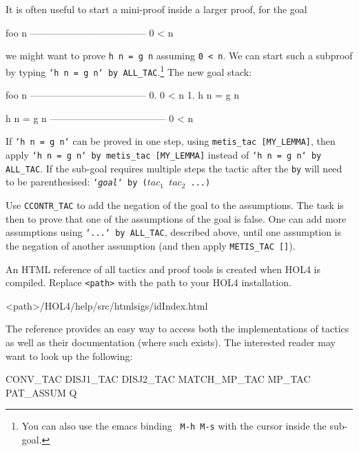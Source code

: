 \documentclass[a4paper,10pt]{article}
\begin{document}

It is often useful to start a mini-proof inside a larger proof, \eg{} for the goal
\begin{code}
    foo n
    ------------------------------------
      0 < n
\end{code}
we might want to prove {\tt\small h n = g n} assuming {\tt\small 0 <
  n}.  We can start such a subproof by typing {\tt\small `h n = g n`
  by ALL\_TAC}.\footnote{You can also use the emacs binding {\tt\small
    M-h M-s} with the cursor inside the sub-goal.} The new goal stack:
\begin{code}
    foo n
    ------------------------------------
      0.  0 < n
      1.  h n = g n

    h n = g n
    ------------------------------------
      0 < n
\end{code}
If {\tt\small `h n = g n`} can be proved in one step, \eg{} using {\tt\small metis\_tac [MY\_LEMMA]}, then
apply {\tt\small `h n = g n` by metis\_tac [MY\_LEMMA]} instead of
{\tt\small `h n = g n` by ALL\_TAC}.  If the sub-goal requires
multiple steps the tactic after the \texttt{by} will need to be
parenthesised: {\tt\small`\textit{goal}` by ($\mathit{tac}_1$ \ml{\gt\gt}
  $\mathit{tac}_2$ ...)}


Use {\tt\small CCONTR\_TAC} to add the negation of the goal to the
assumptions.  The task is then to prove that one of the assumptions of
the goal is false. One can \eg{} add more assumptions using
{\tt\small `...` by ALL\_TAC}, described above, until one assumption is the
negation of another assumption (and then apply {\tt\small METIS\_TAC []}).


An HTML reference of all tactics and proof tools is created when HOL4 is compiled.
Replace {\tt\small <path>} with the path to your HOL4 installation.
\begin{code}
<path>/HOL4/help/src/htmlsigs/idIndex.html
\end{code}
The reference provides an easy way to access both the implementations of
tactics as well as their documentation (where such exists).
The interested reader may want to look up the following:
\begin{code}
CONV_TAC  DISJ1_TAC  DISJ2_TAC  MATCH_MP_TAC  MP_TAC  PAT_ASSUM  Q
\end{code}

\end{document}
